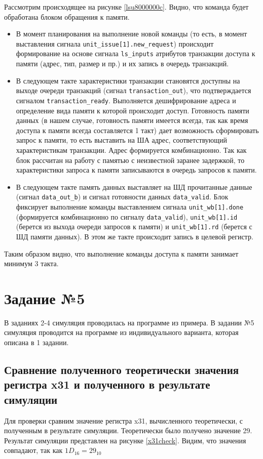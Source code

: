 \documentclass[12pt]{report}
\begin{document}
Рассмотрим происходящее на рисунке \ref{lsu8000000c}. Видно, что команда будет обработана блоком обращения к памяти.
\begin{itemize}
\item В момент планирования на выполнение новой команды (то есть, в момент выставления сигнала \verb|unit_issue[1].new_request|) происходит формирование на основе сигнала \verb|ls_inputs| атрибутов транзакции доступа к памяти (адрес, тип, размер и пр.) и их запись в очередь транзакций.
\item В следующем такте характеристики транзакции становятся доступны на выходе очереди транзакций (сигнал \verb|transaction_out|), что подтверждается сигналом \verb|transaction_ready|. Выполняется дешифрирование адреса и определение вида памяти к которой происходит доступ. Готовность памяти данных (в нашем случае, готовность памяти имеется всегда, так как время доступа к памяти всегда составляется 1 такт) дает возможность сформировать запрос к памяти, то есть выставить на ША адрес, соответствующий характеристикам транзакции. Адрес формируется комбинационно. Так как блок рассчитан на работу с памятью с неизвестной заранее задержкой, то характеристики запроса к памяти записываются в очередь запросов к памяти.
\item В следующем такте память данных выставляет на ШД прочитанные данные (сигнал \verb|data_out_b|) и сигнал готовности данных \verb|data_valid|. Блок фиксирует выполнение команды выставлением сигнала \verb|unit_wb[1].done| (формируется комбинационно по сигналу \verb|data_valid|), \verb|unit_wb[1].id| (берется из выхода очереди запросов к памяти) и \verb|unit_wb[1].rd| (берется с ШД памяти данных). В этом же такте происходит запись в целевой регистр. 
\end{itemize}

Таким образом видно, что выполнение команды доступа к памяти занимает минимум 3 такта.

\chapter{Задание №5}
В заданиях 2-4 симуляция проводилась на программе из примера. В задании №5 симуляция проводится на программе из индивидуального варианта, которая описана в 1 задании. 

\section{Сравнение полученного теоретически значения регистра x31 и полученного в результате симуляции}
Для проверки сравним значение регистра x31, вычисленного теоретически, с полученным в результате симуляции. Теоретически было получено значение 29. Результат симуляции представлен на рисунке \ref{x31check}. Видим, что значения совпадают, так как ${1D}_{16} = {29}_{10}$
\end{document}
